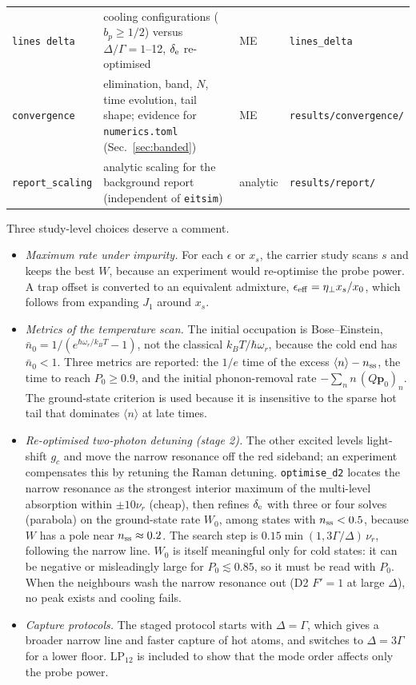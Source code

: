 \documentclass[11pt,a4paper]{article}
\newcommand{\etap}{\eta_\perp}
\newcommand{\code}[1]{\texttt{#1}}
\begin{document}
\begin{table}[h]
\begin{tabularx}{\textwidth}{@{}lXll@{}}
\code{lines delta} & cooling configurations ($b_p\ge1/2$) versus $\Delta/\Gamma=1$--12, $\delta_{\rm e}$ re-optimised & ME & \code{lines\_delta}\\
\code{convergence} & elimination, band, $N$, time evolution, tail shape; evidence for \code{numerics.toml} (Sec.~\ref{sec:banded}) & ME & \code{results/convergence/}\\
\code{report\_scaling} & analytic scaling for the background report (independent of \code{eitsim}) & analytic & \code{results/report/}\\
\bottomrule
\end{tabularx}
\end{table}

Three study-level choices deserve a comment.
\begin{itemize}
\item \emph{Maximum rate under impurity.} For each $\epsilon$ or $x_s$, the carrier study scans $s$ and keeps the best $W$, because an experiment would re-optimise the probe power. A trap offset is converted to an equivalent admixture, $\epsilon_{\rm eff}=\etap x_s/x_0$, which follows from expanding $J_1$ around $x_s$.
\item \emph{Metrics of the temperature scan.} The initial occupation is Bose--Einstein, $\bar n_0=1/(e^{\hbar\omega_r/k_BT}-1)$, not the classical $k_BT/\hbar\omega_r$, because the cold end has $\bar n_0<1$. Three metrics are reported: the $1/e$ time of the excess $\langle n\rangle-n_{\rm ss}$, the time to reach $P_0\ge0.9$, and the initial phonon-removal rate $-\sum_n n\,(Q\bm p_0)_n$. The ground-state criterion is used because it is insensitive to the sparse hot tail that dominates $\langle n\rangle$ at late times.
\item \emph{Re-optimised two-photon detuning (stage 2).} The other excited levels light-shift $g_c$ and move the narrow resonance off the red sideband; an experiment compensates this by retuning the Raman detuning. \code{optimise\_d2} locates the narrow resonance as the strongest interior maximum of the multi-level absorption within $\pm10\nu_r$ (cheap), then refines $\delta_{\rm e}$ with three or four solves (parabola) on the ground-state rate $W_0$, among states with $n_{\rm ss}<0.5$, because $W$ has a pole near $n_{\rm ss}\approx0.2$. The search step is $0.15\min(1,3\Gamma/\Delta)\,\nu_r$, following the narrow line. $W_0$ is itself meaningful only for cold states: it can be negative or misleadingly large for $P_0\lesssim0.85$, so it must be read with $P_0$. When the neighbours wash the narrow resonance out (D2 $F'=1$ at large $\Delta$), no peak exists and cooling fails.
\item \emph{Capture protocols.} The staged protocol starts with $\Delta=\Gamma$, which gives a broader narrow line and faster capture of hot atoms, and switches to $\Delta=3\Gamma$ for a lower floor. LP$_{12}$ is included to show that the mode order affects only the probe power.
\end{itemize}
\end{document}

